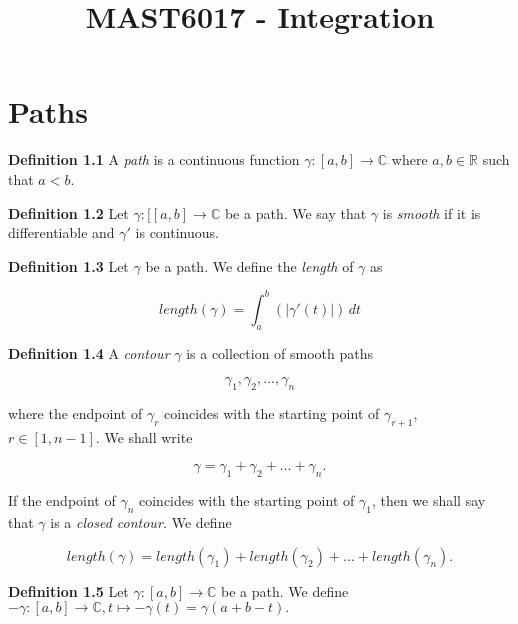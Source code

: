 \documentclass{article}
\title{MAST6017 - Integration}
\date{}
\begin{document}
\maketitle
\section{Paths}
\textbf{Definition 1.1} A {\it{path}} is a continuous function $\gamma:[a,b] \rightarrow 	\mathbb{C}$ where $a,b \in \mathbb{R}$ such that $a < b.$

\bigskip

\textbf{Definition 1.2} Let $\gamma:[[a,b] \rightarrow 	\mathbb{C}$ be a path. We say that $\gamma$ is {\it{smooth}} if it is differentiable and $\gamma'$ is continuous.

\bigskip

\textbf{Definition 1.3} Let $\gamma$ be a path. We define the {\it{length}} of $\gamma$ as 

\begin{equation}
    length(\gamma) = \int_{a}^{b} (|\gamma'(t)|) \, dt
\end{equation}

\bigskip

\textbf{Definition 1.4} A {\it{contour}} $\gamma$ is a collection of smooth paths 

\begin{equation}
    \gamma_1, \gamma_2, ..., \gamma_n
\end{equation}

where the endpoint of $\gamma_r$ coincides with the starting point of $\gamma_{r+1}$, $r \in [1, n-1].$ We shall write 

\begin{equation}
    \gamma = \gamma_1 + \gamma_2 + ... + \gamma_n.
\end{equation}

If the endpoint of $\gamma_n$ coincides with the starting point of $\gamma_1$, then we shall say that $\gamma$ is a {\it{closed contour.}} We define

\begin{equation}
    length(\gamma) = length(\gamma_1) + length(\gamma_2) + ... + length(\gamma_n).
\end{equation}

\bigskip

\textbf{Definition 1.5} Let $\gamma:[a, b] \rightarrow \mathbb{C}$ be a path. We define $-\gamma:[a, b] \rightarrow \mathbb{C}, t \mapsto -\gamma(t) = \gamma(a + b -t).$
\end{document}
